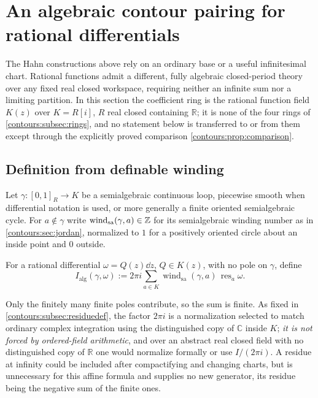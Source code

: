 \documentclass[11pt,letterpaper]{article}
\theoremstyle{definition}
\theoremstyle{remark}
\newcommand{\R}{\mathbb R}\newcommand{\C}{\mathbb C}\newcommand{\Q}{\mathbb Q}
\newcommand{\res}{\operatorname{res}}\newcommand{\wind}{\operatorname{wind}}
\numberwithin{equation}{section}
\begin{document}
\section{An algebraic contour pairing for rational differentials}
\label{contours:sec:algebraic}

The Hahn constructions above rely on an ordinary base or a useful infinitesimal
chart. Rational functions admit a different, fully algebraic closed-period theory
over any fixed real closed workspace, requiring neither an infinite sum nor a
limiting partition. In this section the coefficient ring is the rational function
field $K(z)$ over $K=R[i]$, $R$ real closed containing $\R$; it is none of the four
rings of \cref{contours:subsec:rings}, and no statement below is transferred to or
from them except through the explicitly proved comparison
\cref{contours:prop:comparison}.

\subsection{Definition from definable winding}
Let $\gamma:[0,1]_R\to K$ be a semialgebraic continuous loop, piecewise smooth when
differential notation is used, or more generally a finite oriented semialgebraic
cycle. For $a\notin\gamma$ write $\wind_{\mathrm{sa}}(\gamma,a)\in\Z$ for its
semialgebraic winding number as in \cref{contours:sec:jordan}, normalized to $1$ for
a positively oriented circle about an inside point and $0$ outside.

\begin{definition}
\label{contours:def:algpairing}
For a rational differential $\omega=Q(z)\dd z$, $Q\in K(z)$, with no pole on
$\gamma$, define
\begin{equation}\label{contours:eq:algebraicpairing}
 \boxed{\qquad
 I_{\mathrm{alg}}(\gamma,\omega)
 :=2\pi i\sum_{a\in K}\wind_{\mathrm{sa}}(\gamma,a)\,\res_a\omega .
 \qquad}
\end{equation}
\end{definition}

Only the finitely many finite poles contribute, so the sum is finite. As fixed in
\cref{contours:subsec:residuedef}, the factor $2\pi i$ is a normalization selected
to match ordinary complex integration using the distinguished copy of $\C$ inside
$K$; \emph{it is not forced by ordered-field arithmetic}, and over an abstract real
closed field with no distinguished copy of $\R$ one would normalize formally or use
$I/(2\pi i)$. A residue at infinity could be included after compactifying and
changing charts, but is unnecessary for this affine formula and supplies no new
generator, its residue being the negative sum of the finite ones.
\end{document}
